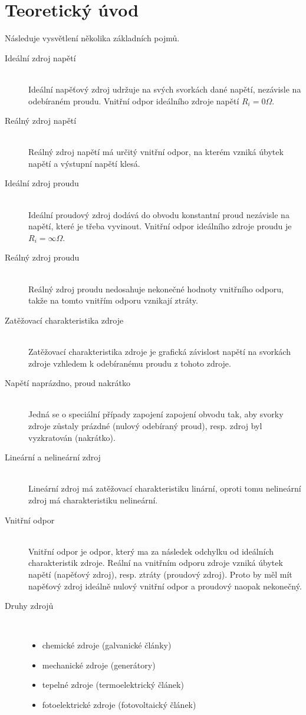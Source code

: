 \documentclass[12pt]{article} %
\begin{document}
\section{Teoretický úvod}
Následuje vysvětlení několika základních pojmů.
\begin{description}
\item[Ideální zdroj napětí] \hfill \\ Ideální napěťový zdroj udržuje na svých svorkách dané napětí, nezávisle na odebíraném proudu. Vnitřní odpor ideálního zdroje napětí $R_i=0\Omega$.
\item[Reálný zdroj napětí] \hfill \\ Reálný zdroj napětí má určitý vnitřní odpor, na kterém vzniká úbytek napětí a výstupní napětí klesá.
\item[Ideální zdroj proudu] \hfill \\ Ideální proudový zdroj dodává do obvodu konstantní proud nezávisle na napětí, které je třeba vyvinout. Vnitřní odpor ideálního zdroje proudu je $R_i=\infty\Omega$.
\item[Reálný zdroj proudu] \hfill \\ Reálný zdroj proudu nedosahuje nekonečné hodnoty vnitřního odporu, takže na tomto vnitřím odporu vznikají ztráty.
\item[Zatěžovací charakteristika zdroje] \hfill \\ Zatěžovací charakteristika zdroje je grafická závislost napětí na svorkách zdroje vzhledem k odebíranému proudu z tohoto zdroje.
\item[Napětí naprázdno, proud nakrátko] \hfill \\ Jedná se o speciální případy zapojení zapojení obvodu tak, aby svorky zdroje zůstaly prázdné (nulový odebíraný proud), resp. zdroj byl vyzkratován (nakrátko).
\item[Lineární a nelineární zdroj] \hfill \\ Lineární zdroj má zatěžovací charakteristiku linární, oproti tomu nelineární zdroj má charakteristiku nelineární.
\item[Vnitřní odpor] \hfill \\ Vnitřní odpor je odpor, který ma za následek odchylku od ideálních charakteristik zdroje. Reální na vnitřním odporu zdroje vzniká úbytek napětí (napěťový zdroj), resp. ztráty (proudový zdroj). Proto by měl mít napěťový zdroj ideálně nulový vnitřní odpor a proudový naopak nekonečný.
\item[Druhy zdrojů] \hfill \\
\begin{itemize}
\item chemické zdroje (galvanické články)
\item mechanické zdroje (generátory)
\item tepelné zdroje (termoelektrický článek)
\item fotoelektrické zdroje (fotovoltaický článek)
\end{itemize}
\end{description}
\end{document}

